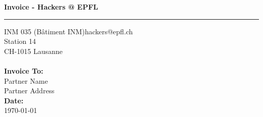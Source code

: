 \documentclass{invoice} %
\def \tab {\hspace*{3ex}} %
\begin{document}

\hfil{\huge \bf Invoice - Hackers @ EPFL}\hfil %
\bigskip\break %
\hrule %

INM 035 (Bâtiment INM)\hfill hackers@epfl.ch\\
Station 14 \\
CH-1015 Lausanne
\\ \\
{ \bf Invoice To:} \\
\tab Partner Name \\ %
\tab Partner Address \\ %

{\bf Date:} \\
\tab \today \\ %


\begin{invoiceTable}










\end{invoiceTable}

\end{document}
